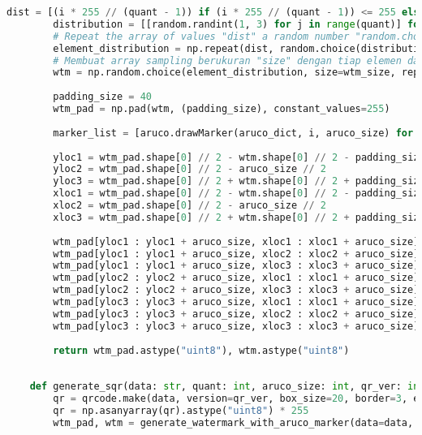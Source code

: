 \begin{lstlisting}[language=Python]
        dist = [(i * 255 // (quant - 1)) if (i * 255 // (quant - 1)) <= 255 else 255 for i in range(quant)]  # Membuat distribusi elemen [0, 255]
        distribution = [[random.randint(1, 3) for j in range(quant)] for i in range(10)]  # Membuat distribusi perbandingan tiap2 elemen kuantisasi sebanyak 10 macam, maksimal perbandingan 1:3 -> [[1, 2], [1, 3], ..., [1,1]]
        # Repeat the array of values "dist" a random number "random.choice(distribution) -> [1,2]" of times
        element_distribution = np.repeat(dist, random.choice(distribution))
        # Membuat array sampling berukuran "size" dengan tiap elemen dapat diulang dari distribusi elemen yang sudah digenerate
        wtm = np.random.choice(element_distribution, size=wtm_size, replace=True)
    
        padding_size = 40
        wtm_pad = np.pad(wtm, (padding_size), constant_values=255)
    
        marker_list = [aruco.drawMarker(aruco_dict, i, aruco_size) for i in range(8)]
    
        yloc1 = wtm_pad.shape[0] // 2 - wtm.shape[0] // 2 - padding_size // 2 - aruco_size // 2
        yloc2 = wtm_pad.shape[0] // 2 - aruco_size // 2
        yloc3 = wtm_pad.shape[0] // 2 + wtm.shape[0] // 2 + padding_size // 2 - aruco_size // 2
        xloc1 = wtm_pad.shape[0] // 2 - wtm.shape[0] // 2 - padding_size // 2 - aruco_size // 2
        xloc2 = wtm_pad.shape[0] // 2 - aruco_size // 2
        xloc3 = wtm_pad.shape[0] // 2 + wtm.shape[0] // 2 + padding_size // 2 - aruco_size // 2
    
        wtm_pad[yloc1 : yloc1 + aruco_size, xloc1 : xloc1 + aruco_size] = marker_list[0]
        wtm_pad[yloc1 : yloc1 + aruco_size, xloc2 : xloc2 + aruco_size] = marker_list[1]
        wtm_pad[yloc1 : yloc1 + aruco_size, xloc3 : xloc3 + aruco_size] = marker_list[2]
        wtm_pad[yloc2 : yloc2 + aruco_size, xloc1 : xloc1 + aruco_size] = marker_list[3]
        wtm_pad[yloc2 : yloc2 + aruco_size, xloc3 : xloc3 + aruco_size] = marker_list[4]
        wtm_pad[yloc3 : yloc3 + aruco_size, xloc1 : xloc1 + aruco_size] = marker_list[5]
        wtm_pad[yloc3 : yloc3 + aruco_size, xloc2 : xloc2 + aruco_size] = marker_list[6]
        wtm_pad[yloc3 : yloc3 + aruco_size, xloc3 : xloc3 + aruco_size] = marker_list[7]
    
        return wtm_pad.astype("uint8"), wtm.astype("uint8")
    
    
    def generate_sqr(data: str, quant: int, aruco_size: int, qr_ver: int = 3, secret: str = SECRET) -> np.ndarray:
        qr = qrcode.make(data, version=qr_ver, box_size=20, border=3, error_correction=qrcode.constants.ERROR_CORRECT_H)
        qr = np.asanyarray(qr).astype("uint8") * 255
        wtm_pad, wtm = generate_watermark_with_aruco_marker(data=data, quant=quant, aruco_size=aruco_size, secret=secret)
    

\end{lstlisting}
